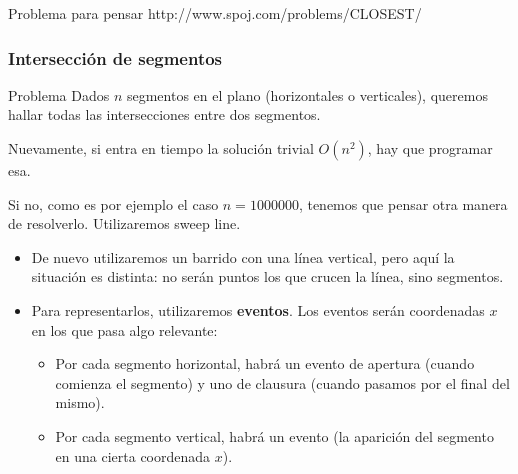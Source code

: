 \documentclass[compress]{beamer}
\begin{document}
\begin{frame}{Problema para pensar}
http://www.spoj.com/problems/CLOSEST/
\end{frame}

\subsubsection{Intersecci\'on de segmentos}

\begin{frame}
\begin{block}{Problema}
Dados $n$ segmentos en el plano (horizontales o verticales), queremos hallar todas las intersecciones entre dos segmentos.
\end{block}

\bigskip
Nuevamente, si entra en tiempo la soluci\'on trivial $O(n^2)$, hay que programar esa.
\bigskip

Si no, como es por ejemplo el caso $n = 1000000$, tenemos que pensar otra manera de resolverlo. Utilizaremos sweep line.

\end{frame}

\begin{frame}
\begin{itemize}
\item De nuevo utilizaremos un barrido con una l\'inea vertical, pero aqu\'i la situaci\'on es distinta: no ser\'an puntos los que crucen la l\'inea, sino segmentos.
\bigskip
\item Para representarlos, utilizaremos \textbf{eventos}. Los eventos ser\'an coordenadas $x$ en los que pasa algo relevante:
\bigskip
\begin{itemize}
\item Por cada segmento horizontal, habr\'a un evento de apertura (cuando comienza el segmento) y uno de clausura (cuando pasamos por el final del mismo). 
\bigskip

\item Por cada segmento vertical, habr\'a un evento (la aparici\'on del segmento en una cierta coordenada $x$).
\end{itemize}
\end{itemize}
\end{frame}
\end{document}
